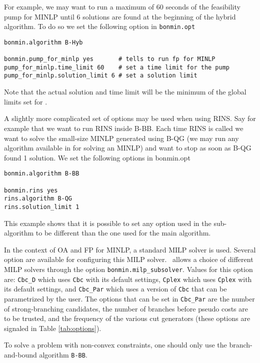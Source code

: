 For example, we may want to run a maximum of 60 seconds of the feasibility pump for MINLP until 6 solutions are found at the beginning of the hybrid algorithm. To do so 
we set the following option in {\tt bonmin.opt}
\begin{verbatim}
bonmin.algorithm B-Hyb

bonmin.pump_for_minlp yes       # tells to run fp for MINLP
pump_for_minlp.time_limit 60    # set a time limit for the pump
pump_for_minlp.solution_limit 6 # set a solution limit
\end{verbatim}

Note that the actual solution and time limit will be the minimum of the global limits set for \Bonmin.

A slightly more complicated set of options may be used when using RINS. Say for example that we want to run RINS inside B-BB. Each time RINS is called we want
to solve the small-size MINLP generated using B-QG (we may run any algorithm available in \Bonmin for solving an MINLP) and want to stop as soon as B-QG found 1 solution.
We set the following options in bonmin.opt

\begin{verbatim}
bonmin.algorithm B-BB

bonmin.rins yes
rins.algorithm B-QG
rins.solution_limit 1

\end{verbatim}
This example shows that it is possible to set any option used in the sub-algorithm to be different than the one used for the main algorithm.


In the context of OA and FP for MINLP, a standard MILP solver is used.
Several option are available for configuring this MILP solver.
\Bonmin\ allows a choice of different MILP solvers through the option
{\tt bonmin.milp\_subsolver}. Values for this option are: {\tt Cbc\_D} which uses {\tt Cbc} with its
default settings, {\tt Cplex} which uses {\tt Cplex} with its default settings, and
{\tt Cbc\_Par} which uses a version of {\tt Cbc} that can be parametrized by the user.
The options that can be set in {\tt Cbc\_Par} are the number of strong-branching candidates,
the number of branches before pseudo costs are to be trusted, and the frequency of the various cut generators
(these options are signaled in Table \ref{tab:options}).

\label{sec:non_convex}
To solve a problem with non-convex constraints, one should only use the branch-and-bound algorithm {\tt B-BB}.


